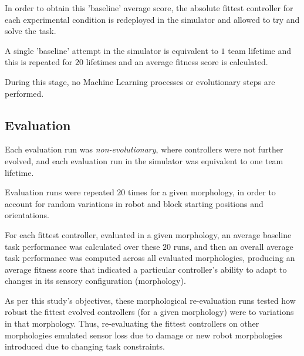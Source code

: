 In order to obtain this 'baseline' average score, the absolute fittest controller for each experimental condition is redeployed in the simulator and allowed to try and solve the task. 

A single 'baseline' attempt in the simulator is equivalent to $1$ team lifetime and this is repeated for $20$ lifetimes and an average fitness score is calculated.

During this stage, no Machine Learning processes or evolutionary steps are performed.

\subsection{Evaluation}

Each evaluation run was \textit{non-evolutionary}, where controllers were not further evolved,
and each evaluation run in the simulator was equivalent to one team lifetime.

Evaluation runs were repeated $20$ times for a given morphology, in order to account for random variations in robot and block
starting positions and orientations.

For each fittest controller, evaluated in a given morphology, an average baseline task performance was
calculated over these $20$ runs, and then an overall average task performance was computed across all evaluated morphologies, producing an average fitness score that indicated a particular controller's ability to adapt to changes in its sensory configuration (morphology).

As per this study's objectives, these morphological re-evaluation
runs tested how robust the fittest evolved controllers (for a given morphology) were to variations
in that morphology.
Thus, re-evaluating the fittest controllers on other morphologies emulated sensor loss due
to damage or new robot morphologies introduced due to changing task constraints.



